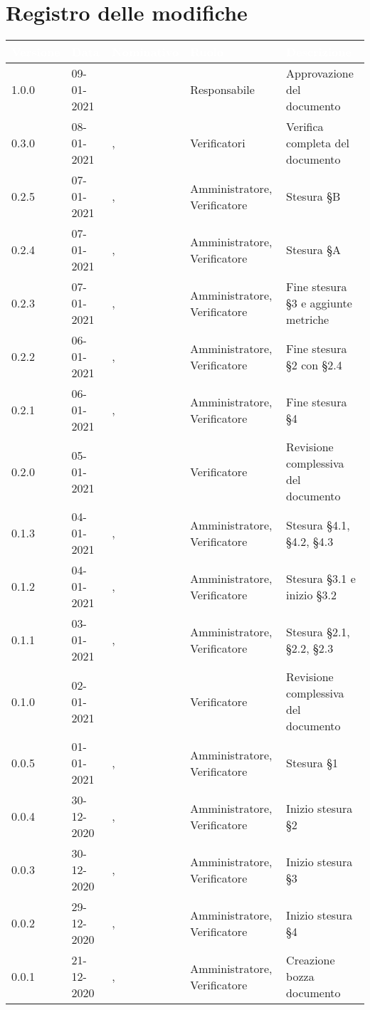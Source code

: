 \section*{Registro delle modifiche}
\setcounter{table}{-1}
{
\renewcommand{\arraystretch}{1.5}
\centering
\begin{longtable}{C{1.7cm} C{2.5cm} C{3.2cm} C{2.7cm} C{4.8cm}}
\textcolor{white}{\textbf{Versione}}&
\textcolor{white}{\textbf{Data}}&
\textcolor{white}{\textbf{Nominativo}}&
\textcolor{white}{\textbf{Ruolo}}&
\textcolor{white}{\textbf{Descrizione}}\\	
\endhead

1.0.0 & 09-01-2021 & \BM{} & Responsabile & Approvazione del documento \\
0.3.0 & 08-01-2021 & \SP{}, \BM{} & Verificatori & Verifica completa del documento \\
0.2.5 & 07-01-2021 & \RA{}, \BM{} & Amministratore, Verificatore & Stesura \S B \\
0.2.4 & 07-01-2021 & \PA{}, \SP{} & Amministratore, Verificatore & Stesura \S A \\
0.2.3 & 07-01-2021 & \ZM{}, \BM{} & Amministratore, Verificatore & Fine stesura \S 3 e aggiunte metriche \\
0.2.2 & 06-01-2021 & \PA{}, \SP{} & Amministratore, Verificatore & Fine stesura \S 2 con \S 2.4   \\
0.2.1 & 06-01-2021 & \RA{}, \BM{} & Amministratore, Verificatore & Fine stesura \S 4\\
0.2.0 & 05-01-2021 & \BM{} & Verificatore & Revisione complessiva del documento \\
0.1.3 & 04-01-2021 & \RA{}, \SP{} & Amministratore, Verificatore & Stesura \S 4.1, \S 4.2, \S 4.3 \\
0.1.2 & 04-01-2021 & \ZM{}, \BM{} & Amministratore, Verificatore & Stesura \S 3.1 e inizio \S 3.2\\
0.1.1 & 03-01-2021 & \PA{}, \SP{} & Amministratore, Verificatore & Stesura \S 2.1, \S 2.2, \S 2.3 \\
0.1.0 & 02-01-2021 & \BM{} & Verificatore & Revisione complessiva del documento \\
0.0.5 & 01-01-2021 & \ZM{}, \SP{} & Amministratore, Verificatore & Stesura \S 1\\
0.0.4 & 30-12-2020 & \PA{}, \SP{} & Amministratore, Verificatore & Inizio stesura \S 2 \\
0.0.3 & 30-12-2020 & \ZM{}, \BM{} & Amministratore, Verificatore & Inizio stesura \S 3\\
0.0.2 & 29-12-2020 & \RA{}, \SP{} & Amministratore, Verificatore & Inizio stesura \S 4 \\
0.0.1 & 21-12-2020 & \ZM{}, \BM{} & Amministratore, Verificatore & Creazione bozza documento \\	
\end{longtable}
}
